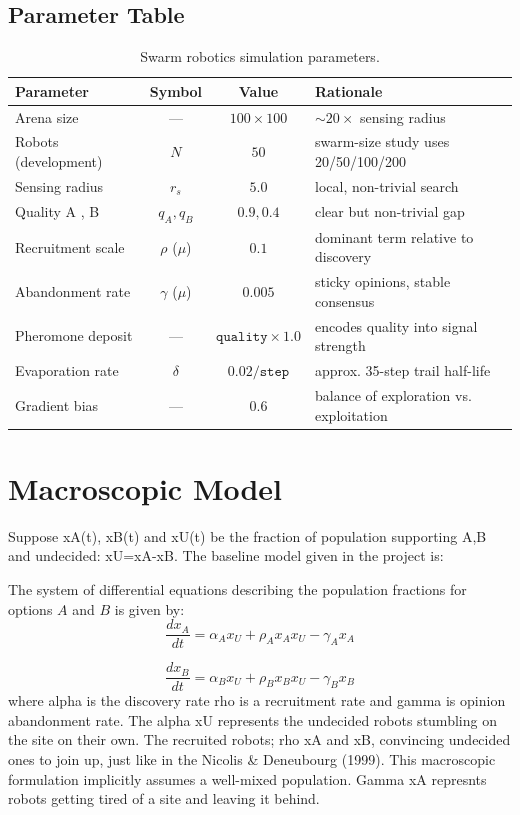 \documentclass{article}
\begin{document}
\subsection{Parameter Table}
\begin{table}[htbp]
\centering
\begin{tabular}{|l|c|c|l|}
\hline
\textbf{Parameter} & \textbf{Symbol} & \textbf{Value} & \textbf{Rationale} \\ \hline
Arena size & — & $100 \times 100$ & $\sim 20\times$ sensing radius \\ \hline
Robots (development) & $N$ & $50$ & swarm-size study uses 20/50/100/200 \\ \hline
Sensing radius & $r_s$ & $5.0$ & local, non-trivial search \\ \hline
Quality A , B & $q_A, q_B$ & $0.9 , 0.4$ & clear but non-trivial gap \\ \hline
Recruitment scale & $\rho$ ($\mu$) & $0.1$ & dominant term relative to discovery \\ \hline
Abandonment rate & $\gamma$ ($\mu$) & $0.005$ & sticky opinions, stable consensus \\ \hline
Pheromone deposit & — & $\texttt{quality} \times 1.0$ & encodes quality into signal strength \\ \hline
Evaporation rate & $\delta$ & $0.02/\texttt{step}$ & approx. 35-step trail half-life \\ \hline
Gradient bias & — & $0.6$ & balance of exploration vs. exploitation \\ \hline
\end{tabular}
\caption{Swarm robotics simulation parameters.}
\label{tab:swarm_parameters}
\end{table}
\section{Macroscopic Model}
Suppose xA(t), xB(t) and xU(t) be the fraction of population supporting A,B and undecided: xU=xA-xB. The baseline model given in the project is:


The system of differential equations describing the population fractions for options $A$ and $B$ is given by:
\[
\frac{dx_A}{dt} = \alpha_A x_U + \rho_A x_A x_U - \gamma_A x_A
\]

\[
\frac{dx_B}{dt} = \alpha_B x_U + \rho_B x_B x_U - \gamma_B x_B
\]
where alpha is the discovery rate rho is a recruitment rate and gamma is opinion abandonment rate. The alpha xU represents the undecided robots stumbling on the site on their own. The recruited robots; rho xA and xB, convincing undecided ones to join up, just like in the Nicolis \& Deneubourg (1999). This macroscopic formulation implicitly assumes a well-mixed population. Gamma xA represnts robots getting tired of a site and leaving it behind. 
\end{document}
